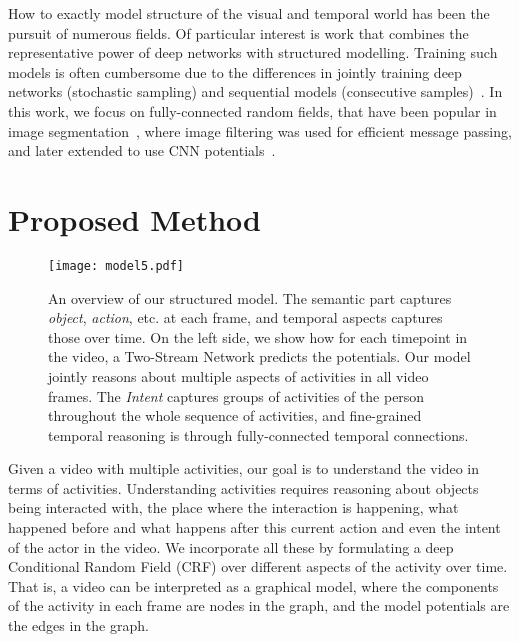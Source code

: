 \documentclass[10pt,twocolumn,letterpaper]{article}
\begin{document}
How to exactly model structure of the visual and temporal world has been the pursuit of numerous fields. Of particular interest is work that combines the representative power of deep networks with structured modelling. Training such models is often cumbersome due to the differences in jointly training deep networks (stochastic sampling) and sequential models (consecutive samples)~\cite{mnih2013playing,raqueldense2016}.
In this work, we focus on fully-connected random fields, that have been popular in image segmentation~\cite{densecrfsegmentation}, where image filtering was used for efficient message passing, and later extended to use CNN potentials~\cite{schwing2015fully}.


\section{Proposed Method} \label{sect:app}

\begin{figure*}[t]
\centering
\texttt{[image: model5.pdf]}
\caption{An overview of our structured model. The semantic part captures \emph{object}, \emph{action}, etc. at each frame, and temporal aspects captures those over time. On the left side, we show how for each timepoint in the video, a Two-Stream Network predicts the potentials. Our model jointly reasons about multiple aspects of activities in all video frames. The \emph{Intent} captures groups of activities of the person throughout the whole sequence of activities, and fine-grained temporal reasoning is through fully-connected temporal connections.}
\label{fig:model}
\end{figure*}

Given a video with multiple activities, our goal is to understand the video in terms of activities. Understanding activities requires reasoning about objects being interacted with, the place where the interaction is happening, what happened before and what happens after this current action and even the intent of the actor in the video. We incorporate all these by formulating a deep Conditional Random Field (CRF) over different aspects of the activity over time. That is, a video can be interpreted as a graphical model, where the components of the activity in each frame are nodes in the graph, and the model potentials are the edges in the graph. 
\end{document}
